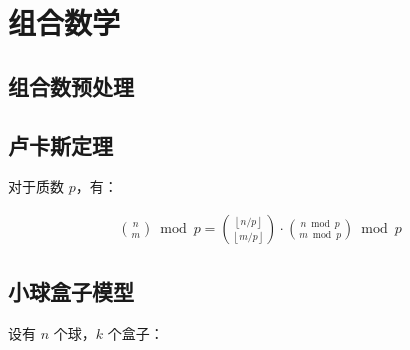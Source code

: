 \documentclass{article}
\begin{document}
\section{组合数学}
\subsection{组合数预处理}

\subsection{卢卡斯定理}

对于质数 $p$，有：

$$
\begin{aligned}
\binom{n}{m}\bmod p = \binom{\left\lfloor n/p \right\rfloor}{\left\lfloor m/p\right\rfloor}\cdot\binom{n\bmod p}{m\bmod p}\bmod p
\end{aligned}
$$



\subsection{小球盒子模型}

设有 $n$ 个球，$k$ 个盒子：
\end{document}
